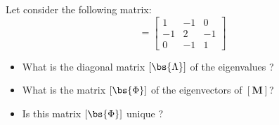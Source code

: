 \bexo
Let consider the following matrix:
\begin{equation}
[\tb{M}]=\left[
\begin{array}{ccc}
{1}&{-1}&{0}\\
{-1}&{ 2}&{-1}\\
{0}&{ -1}&{1}
\end{array}	
\right]
\end{equation}
\begin{itemize}
	\item What is the diagonal matrix $[\bs{\Lambda}]$  of the eigenvalues ?
	\item What is the matrix $[\bs{\Phi}]$ of the eigenvectors of $[\textbf{M}]$? 
	\item Is this matrix $[\bs{\Phi}]$ unique ?
\end{itemize}


\eexo
\solution{ 
}